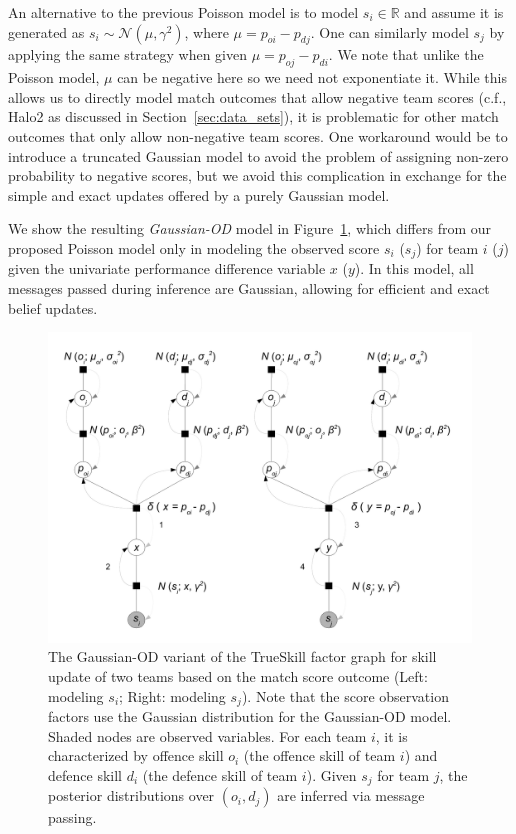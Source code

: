 An alternative to the previous Poisson model is to
model $s_i \in \mathbb{R}$ and assume it
is generated as $s_{i}\sim \mathcal{N}(\mu, \gamma^2)$,
where $\mu = p_{oi}-p_{dj}$.  One can similarly
model $s_j$ by applying the same strategy when given $\mu = p_{oj} -
p_{di}$.  We note that unlike the Poisson model, $\mu$ can be negative
here so we need not exponentiate it.  While this allows us to directly
model match outcomes that allow negative team scores (c.f., Halo2 as
discussed in Section~\ref{sec:data_sets}), it is problematic for other
match outcomes that only allow non-negative team scores.  One
workaround would be to introduce a truncated Gaussian model to avoid
the problem of assigning non-zero probability to negative scores, but
we avoid this complication in exchange for the simple and exact
updates offered by a purely Gaussian model.

We show the resulting \emph{Gaussian-OD} model in
Figure~\ref{fig:GaussianOD}, which
differs from our proposed Poisson model only in modeling the observed score $s_i$ ($s_j$) for team $i$ ($j$) given the univariate performance difference variable $x$ ($y$). In this model, all messages passed during inference
are Gaussian, allowing for efficient and exact belief updates.


\begin{figure}[t!]
\centerline{\includegraphics[scale=0.35]{modelAndInferenceGaussianGraphicalModel}}
\caption{
The Gaussian-OD variant of the TrueSkill factor graph for skill update of two teams based on the match score outcome (Left: modeling $s_i$; Right: modeling $s_j$). Note that the score observation factors use the Gaussian distribution for the Gaussian-OD model. Shaded nodes are observed variables. For each team $i$, it is characterized by offence skill $o_{i}$ (the offence skill of team $i$) and defence skill $d_{i}$ (the defence skill of
team $i$). Given $s_j$ for team $j$, the posterior distributions over $(o_i,d_j)$ are inferred via message passing.
}
\label{fig:GaussianOD}
\end{figure}

